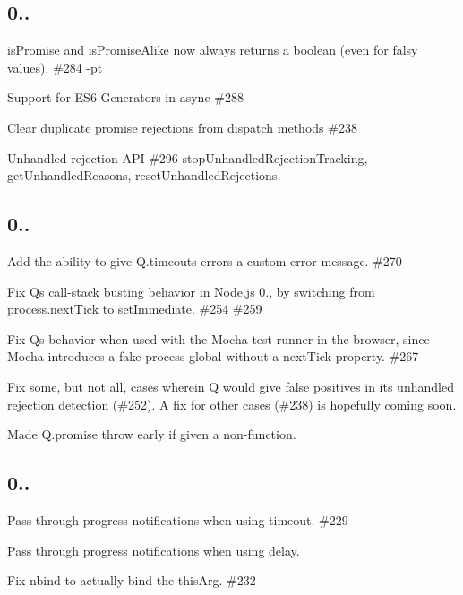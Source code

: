 \subsection*{0..}


\begin{DoxyItemize}
\item {\ttfamily is\+Promise} and {\ttfamily is\+Promise\+Alike} now always returns a boolean (even for falsy values). \#284 -\/pt
\item Support for E\+S6 Generators in {\ttfamily async} \#288 
\item Clear duplicate promise rejections from dispatch methods \#238 
\item Unhandled rejection A\+PI \#296  {\ttfamily stop\+Unhandled\+Rejection\+Tracking}, {\ttfamily get\+Unhandled\+Reasons}, {\ttfamily reset\+Unhandled\+Rejections}.
\end{DoxyItemize}

\subsection*{0..}


\begin{DoxyItemize}
\item Add the ability to give {\ttfamily Q.\+timeout}\textquotesingle{}s errors a custom error message. \#270 
\item Fix Q\textquotesingle{}s call-\/stack busting behavior in Node.\+js 0., by switching from {\ttfamily process.\+next\+Tick} to {\ttfamily set\+Immediate}. \#254 \#259
\item Fix Q\textquotesingle{}s behavior when used with the Mocha test runner in the browser, since Mocha introduces a fake {\ttfamily process} global without a {\ttfamily next\+Tick} property. \#267
\item Fix some, but not all, cases wherein Q would give false positives in its unhandled rejection detection (\#252). A fix for other cases (\#238) is hopefully coming soon.
\item Made {\ttfamily Q.\+promise} throw early if given a non-\/function.
\end{DoxyItemize}

\subsection*{0..}


\begin{DoxyItemize}
\item Pass through progress notifications when using {\ttfamily timeout}. \#229 
\item Pass through progress notifications when using {\ttfamily delay}.
\item Fix {\ttfamily nbind} to actually bind the {\ttfamily this\+Arg}. \#232 
\end{DoxyItemize}

